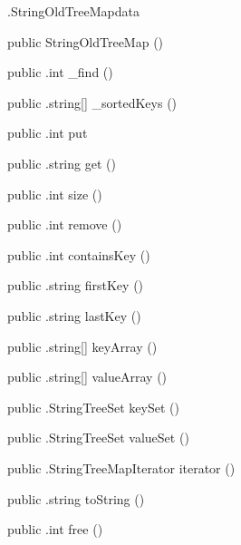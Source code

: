 \begin{CrexxClass}{.StringOldTreeMap}{data}

  \begin{Hierarchy}
  \end{Hierarchy}

  \begin{Members}

    \Factory
      {public}
      {StringOldTreeMap}
      {()}

    \Method
      {public}
      {.int}
      {\_find}
      {()}

    \Method
      {public}
      {.string[]}
      {\_sortedKeys}
      {()}

    \Method
      {public}
      {.int}
      {put}
      {}

    \Method
      {public}
      {.string}
      {get}
      {()}

    \Method
      {public}
      {.int}
      {size}
      {()}

    \Method
      {public}
      {.int}
      {remove}
      {()}

    \Method
      {public}
      {.int}
      {containsKey}
      {()}

    \Method
      {public}
      {.string}
      {firstKey}
      {()}

    \Method
      {public}
      {.string}
      {lastKey}
      {()}

    \Method
      {public}
      {.string[]}
      {keyArray}
      {()}

    \Method
      {public}
      {.string[]}
      {valueArray}
      {()}

    \Method
      {public}
      {.StringTreeSet}
      {keySet}
      {()}

    \Method
      {public}
      {.StringTreeSet}
      {valueSet}
      {()}

    \Method
      {public}
      {.StringTreeMapIterator}
      {iterator}
      {()}

    \Method
      {public}
      {.string}
      {toString}
      {()}

    \Method
      {public}
      {.int}
      {free}
      {()}

  \end{Members}
\end{CrexxClass}

